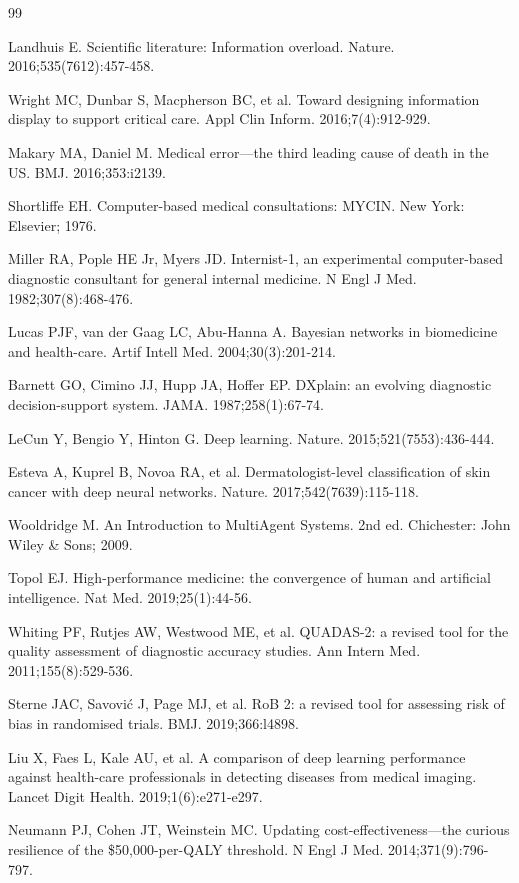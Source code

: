 \documentclass[12pt,letterpaper]{article}
\begin{document}

\begin{thebibliography}{99}

Landhuis E. Scientific literature: Information overload. Nature. 2016;535(7612):457-458.

Wright MC, Dunbar S, Macpherson BC, et al. Toward designing information display to support critical care. Appl Clin Inform. 2016;7(4):912-929.

Makary MA, Daniel M. Medical error—the third leading cause of death in the US. BMJ. 2016;353:i2139.

Shortliffe EH. Computer-based medical consultations: MYCIN. New York: Elsevier; 1976.

Miller RA, Pople HE Jr, Myers JD. Internist-1, an experimental computer-based diagnostic consultant for general internal medicine. N Engl J Med. 1982;307(8):468-476.

Lucas PJF, van der Gaag LC, Abu-Hanna A. Bayesian networks in biomedicine and health-care. Artif Intell Med. 2004;30(3):201-214.

Barnett GO, Cimino JJ, Hupp JA, Hoffer EP. DXplain: an evolving diagnostic decision-support system. JAMA. 1987;258(1):67-74.

LeCun Y, Bengio Y, Hinton G. Deep learning. Nature. 2015;521(7553):436-444.

Esteva A, Kuprel B, Novoa RA, et al. Dermatologist-level classification of skin cancer with deep neural networks. Nature. 2017;542(7639):115-118.

Wooldridge M. An Introduction to MultiAgent Systems. 2nd ed. Chichester: John Wiley \& Sons; 2009.

Topol EJ. High-performance medicine: the convergence of human and artificial intelligence. Nat Med. 2019;25(1):44-56.

Whiting PF, Rutjes AW, Westwood ME, et al. QUADAS-2: a revised tool for the quality assessment of diagnostic accuracy studies. Ann Intern Med. 2011;155(8):529-536.

Sterne JAC, Savović J, Page MJ, et al. RoB 2: a revised tool for assessing risk of bias in randomised trials. BMJ. 2019;366:l4898.

Liu X, Faes L, Kale AU, et al. A comparison of deep learning performance against health-care professionals in detecting diseases from medical imaging. Lancet Digit Health. 2019;1(6):e271-e297.

Neumann PJ, Cohen JT, Weinstein MC. Updating cost-effectiveness—the curious resilience of the \$50,000-per-QALY threshold. N Engl J Med. 2014;371(9):796-797.


\end{thebibliography}
\end{document}
